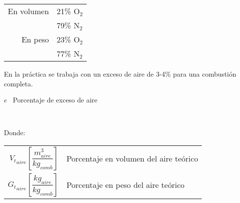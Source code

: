 \documentclass[11pt,a4paper]{article}
\newcommand{\vs}{\vspace{-.3cm}}
\begin{document}
	\begin{cajita}
			
		\begin{center}
		\end{center}
	
		\begin{multicols}{2}
			
			\begin{tabular}{r l}
				En volumen & 21\% O$_2$\\
				& 79\% N$_2$\\
				En peso    & 23\% O$_2$\\
				& 77\% N$_2$\\
			\end{tabular}
		
			
			
			
			\vs
			
			\begin{flushleft}
				En la práctica se trabaja con un exceso de aire de 3-4\%  para una combustión completa.
			\end{flushleft}
		
			
			\begin{flushleft}
				$e$ \, Porcentaje de exceso de aire
			\end{flushleft}
		
			\columnbreak
			
			
			\\ \vspace{.3cm}
			
		
			\begin{flushleft}
				Donde: \vspace{.5cm}
				
				\begin{tabular}{r p{.5\linewidth}}
					 ${V_t}_{aire} \left[\dfrac{m^3_{aire}}{kg_{comb}}\right]$ & Porcentaje en volumen del aire teórico \\
					 ${G_{t}}_{aire} \left[\dfrac{kg_{aire}}{kg_{comb}}\right]$ & Porcentaje en peso del aire teórico
				\end{tabular}
			\end{flushleft}
			
		\end{multicols}
		
	\end{cajita}
\end{document}
